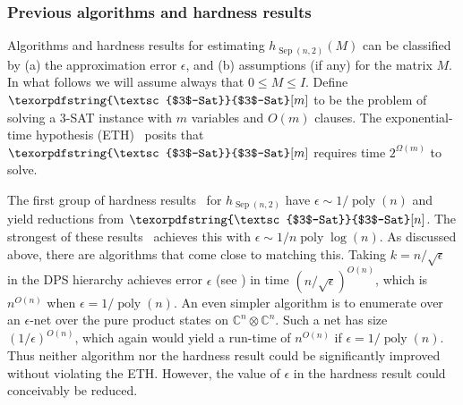 \documentclass[aps,pra,notitlepage,preprintnumbers,11pt,tightenlines]{revtex4-1}
\newcommand{\eps}{\epsilon}
\newcommand{\bbC}{\mathbb{C}}
\newcommand{\ot}{\otimes}
\DeclareMathOperator{\Sep}{Sep}
\DeclareMathOperator{\poly}{poly}
\newcommand{\problemmacro}[1]{\texorpdfstring{\textsc{#1}}{#1}\xspace}
\newcommand{\threesat}{\problemmacro{$3$-Sat}}
\begin{document}
\subsubsection{Previous algorithms and hardness results}\label{sec:previous-sep}
Algorithms and hardness results for estimating $h_{\Sep(n,2)}(M)$ can
be classified by (a) the approximation error $\eps$, and (b)
assumptions (if any) for the matrix $M$.  In what follows we will
assume always that $0 \leq M \leq I$.  Define $\threesat[m]$ to be the
problem of solving a 3-SAT instance with $m$ variables and $O(m)$
clauses.  The exponential-time hypothesis (ETH)~\cite{ImpagliazzoPZ98}
posits that $\threesat[m]$ requires time $2^{\Omega(m)}$ to solve.

The first group of hardness
results~\cite{gurvits:2003,BT09,BeigiS10,ChiesaF13,GallNN11} for $h_{\Sep(n,2)}$
have $\eps \sim 1/\poly(n)$ and yield reductions from $\threesat[n]$.
The strongest of these results~\cite{GallNN11} achieves this with $\eps
\sim 1/n\poly\log(n)$.  As discussed above, there are algorithms that
come close to matching this.  Taking $k=n/\sqrt{\eps}$ in the DPS
hierarchy achieves error $\eps$ (see \cite{NOP09}) in time
$(n/\sqrt{\eps})^{O(n)}$, which is $n^{O(n)}$ when $\eps =
1/\poly(n)$.  An even simpler algorithm is to enumerate over an
$\eps$-net over the pure product states on $\bbC^n \ot \bbC^n$.  Such
a net has size $(1/\eps)^{O(n)}$, which again would yield a run-time
of $n^{O(n)}$ if $\eps = 1/\poly(n)$.
Thus neither algorithm nor the hardness result could
be significantly improved without violating the ETH.  However, the
value of $\eps$ in the hardness result could conceivably be reduced.
\end{document}
